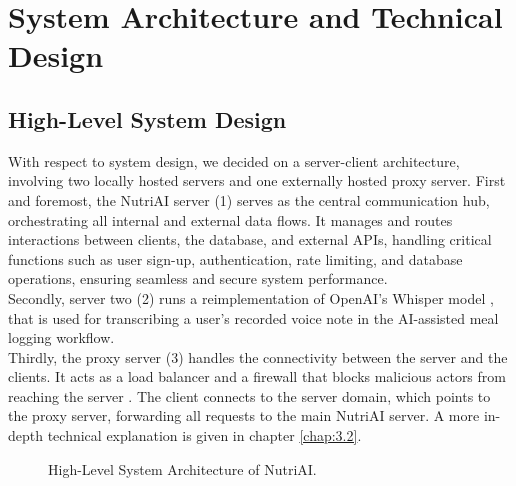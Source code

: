 \documentclass[11pt,a4paper]{article}
\begin{document}
\section{System Architecture and Technical Design}

\subsection{High-Level System Design}
\noindent
With respect to system design, we decided on a server-client architecture, involving two locally hosted servers and one externally hosted proxy server.
First and foremost, the NutriAI server (1) serves as the central communication hub, orchestrating all internal and external data flows. It manages and routes interactions between clients, the database, and external APIs, handling critical functions such as user sign-up, authentication, rate limiting, and database operations, ensuring seamless and secure system performance. \\
Secondly, server two (2) runs a reimplementation of OpenAI's Whisper model \cite{whisper}, that is used for transcribing a user's recorded voice note in the AI-assisted meal logging workflow. \\ Thirdly, the proxy server (3) handles the connectivity between the server and the clients. It acts as a load balancer \cite{pangolin, traefik} and a firewall that blocks malicious actors from reaching the server \cite{pangolin, crowdsec}. The client connects to the server domain, which points to the proxy server, forwarding all requests to the main NutriAI server. A more in-depth technical explanation is given in chapter \ref{chap:3.2}.

\begin{figure}[htbp]
    \centering
    
    \caption{High-Level System Architecture of NutriAI.\protect\footnotemark}
    \label{fig:system_design}
\end{figure}

\end{document}
